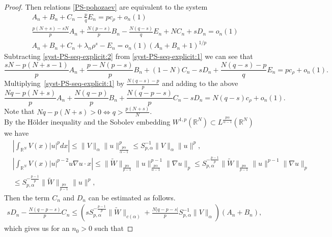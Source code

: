 \documentclass[10pt,a4paper]{amsart}
\newcommand{\rn}{\mathbb{R}^N}
\begin{document}
\begin{proof}
Then relations \eqref{PS-pohozaev} are equivalent to the system
\begin{subequations}
\begin{align}
&A_n+B_n+C_n-\frac{p}{q}E_n=p c_{\rho}+o_n(1) \label{syst-PS-seq-explicit:1}\\
&\frac{p(N+s)-sN}{p}A_n+\frac{N(p-s)}{p}B_n-\frac{N(q-s)}{q}E_n+N C_n+sD_n=o_n(1)\label{syst-PS-seq-explicit:2}\\
&A_n+B_n+C_n+\lambda_n\rho^s-E_n=o_n(1)(A_n+B_n+1)^{1/p}%
\label{syst-PS-seq-explicit:3}
\end{align}
\label{syst-PS-seq-explicit}
\end{subequations} 
Subtracting \eqref{syst-PS-seq-explicit:2} from \eqref{syst-PS-seq-explicit:1} we can see that
$$\frac{sN-p(N+s-1)}{p}A_n+\frac{p-N(p-s)}{p}B_n+(1-N)C_n-sD_n+\frac{N(q-s)-p}{q}E_n=pc_{\rho}+o_n(1).$$
Multiplying~\eqref{syst-PS-seq-explicit:1} by $\frac{N(q-s)-p}{p}$ and adding to the above
\begin{equation}
\label{rel-bd}
\frac{Nq-p(N+s)}{p}A_n+\frac{N(q-p)}{p}B_n+\frac{N(q-p-s)}{p}C_n-sD_n=N(q-s)c_{\rho}+o_n(1).
\end{equation}
Note that $Nq-p(N+s)>0\Leftrightarrow q>\frac{p(N+s)}{N}$.\\
By the H\"{o}lder inequality and the Sobolev embedding $W^{1,p}(\rn)\subset L^{\frac{p\alpha}{\alpha-1}}(\rn)$ we have
\begin{equation}
\label{est-CD}
\begin{aligned}
&\left|\int_{\rn}V(x)|u|^p dx\right|\le \|V\|_{\alpha}\|u\|_{\frac{p\alpha}{\alpha-1}}^p\le S_{p,\alpha}^{-1}\|V\|_{\alpha}\|u\|^p,\\
&\left|\int_{\rn}V(x)|u|^{p-2}u\nabla u\cdotp x\right|\le\|\tilde{W}\|_{\frac{p\alpha}{p-1}}\|u\|_{\frac{p\alpha}{\alpha-1}}^{p-1}\|\nabla u\|_p
\le S_{p,\alpha}^{-\frac{p-1}{p}}\|\tilde{W}\|_{\frac{p\alpha}{p-1}}
\|u\|^{p-1}\|\nabla u\|_p\\
&\le S_{p,\alpha}^{-\frac{p-1}{p}}\|\tilde{W}\|_{\frac{p\alpha}{p-1}}\|u\|^p,  
\end{aligned}    
\end{equation}
Then the term $C_n$ and $D_n$ can be estimated as follows.
\begin{align*}
    sD_n - \frac{N(q-p-s)}{p}C_n
    \le\left( s S_{p,\alpha}^{-\frac{p-1}{p}}\|\tilde{W}\|_{c(\alpha)} 
    + \frac{N|q-p-s|}{p} S_{p,\alpha}^{-1}\|V\|_{\alpha}\right)(A_n+B_n),
\end{align*}
which gives us for an $n_0>0$ such that

\end{proof}
\end{document}
